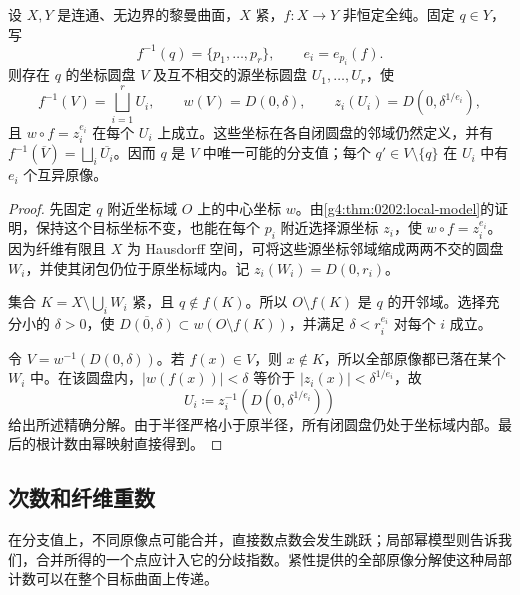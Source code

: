\begin{lemma}\label{g4:lem:0202:isolated-fiber}
	设 \(X,Y\) 是连通、无边界的黎曼曲面，\(X\) 紧，\(f:X\rightarrow Y\) 非恒定全纯。固定 \(q\in Y\)，写
	\[
		f^{-1}(q)=\{p_1,\ldots,p_r\},\qquad e_i=e_{p_i}(f).
	\]
	则存在 \(q\) 的坐标圆盘 \(V\) 及互不相交的源坐标圆盘 \(U_1,\ldots,U_r\)，使
	\[
		f^{-1}(V)=\bigsqcup_{i=1}^r U_i,
		\qquad w(V)=D(0,\delta),\qquad z_i(U_i)=D(0,\delta^{1/e_i}),
	\]
	且 \(w\circ f=z_i^{e_i}\) 在每个 \(U_i\) 上成立。这些坐标在各自闭圆盘的邻域仍然定义，并有 \(f^{-1}(\overline V)=\bigsqcup_i\overline{U_i}\)。因而 \(q\) 是 \(V\) 中唯一可能的分支值；每个 \(q'\in V\setminus\{q\}\) 在 \(U_i\) 中有 \(e_i\) 个互异原像。
\end{lemma}
\begin{proof}
	先固定 \(q\) 附近坐标域 \(O\) 上的中心坐标 \(w\)。由\cref{g4:thm:0202:local-model}的证明，保持这个目标坐标不变，也能在每个 \(p_i\) 附近选择源坐标 \(z_i\)，使 \(w\circ f=z_i^{e_i}\)。因为纤维有限且 \(X\) 为 Hausdorff 空间，可将这些源坐标邻域缩成两两不交的圆盘 \(W_i\)，并使其闭包仍位于原坐标域内。记 \(z_i(W_i)=D(0,r_i)\)。

	集合 \(K=X\setminus\bigcup_iW_i\) 紧，且 \(q\notin f(K)\)。所以 \(O\setminus f(K)\) 是 \(q\) 的开邻域。选择充分小的 \(\delta>0\)，使 \(\overline{D(0,\delta)}\subset w(O\setminus f(K))\)，并满足 \(\delta<r_i^{e_i}\) 对每个 \(i\) 成立。

	令 \(V=w^{-1}(D(0,\delta))\)。若 \(f(x)\in V\)，则 \(x\notin K\)，所以全部原像都已落在某个 \(W_i\) 中。在该圆盘内，\(|w(f(x))|<\delta\) 等价于 \(|z_i(x)|<\delta^{1/e_i}\)，故
	\[
		U_i\coloneqq z_i^{-1}(D(0,\delta^{1/e_i}))
	\]
	给出所述精确分解。由于半径严格小于原半径，所有闭圆盘仍处于坐标域内部。最后的根计数由幂映射直接得到。
\end{proof}

\subsection{次数和纤维重数}
\label{g4:subsec:0202:03}
在分支值上，不同原像点可能合并，直接数点数会发生跳跃；局部幂模型则告诉我们，合并所得的一个点应计入它的分歧指数。紧性提供的全部原像分解使这种局部计数可以在整个目标曲面上传递。


